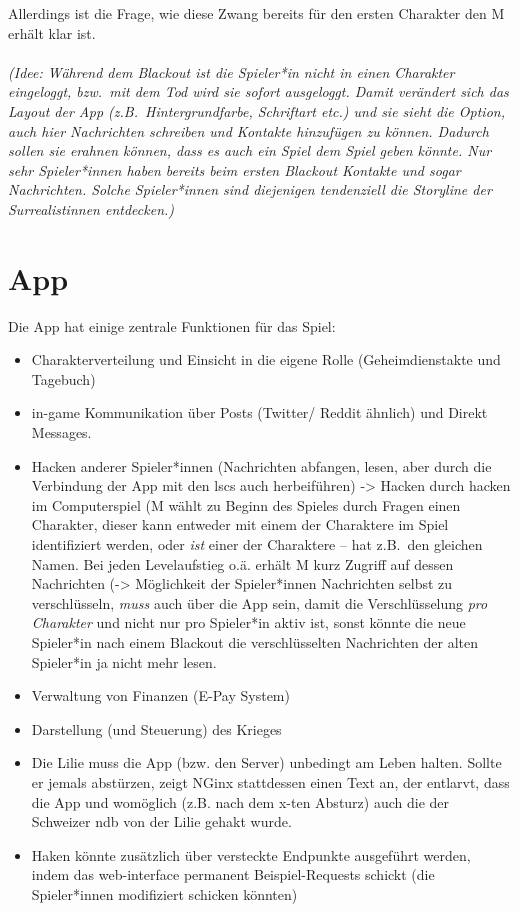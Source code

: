 Allerdings ist die Frage, wie diese Zwang bereits für den ersten Charakter den M
erhält klar ist.\\\\
%
\emph{(Idee: Während dem Blackout ist die Spieler*in nicht in einen Charakter
eingeloggt, bzw.~mit dem Tod wird sie sofort ausgeloggt. Damit verändert sich
das Layout der App (z.B.~Hintergrundfarbe, Schriftart etc.) und sie sieht 
die Option, auch hier Nachrichten schreiben und Kontakte hinzufügen zu können. 
Dadurch sollen sie erahnen können, dass es auch ein Spiel  dem Spiel
geben könnte. Nur sehr Spieler*innen haben bereits beim ersten Blackout Kontakte
und sogar Nachrichten. Solche Spieler*innen sind diejenigen tendenziell die
Storyline der Surrealistinnen entdecken.)}

\section{App} 
Die App hat einige zentrale Funktionen für das Spiel:
\begin{itemize}
  \item Charakterverteilung und Einsicht in die eigene Rolle (Geheimdienstakte
    und Tagebuch)
  \item in-game Kommunikation über Posts (Twitter/ Reddit ähnlich) und Direkt
    Messages. 
  \item Hacken anderer Spieler*innen (Nachrichten abfangen, lesen, aber durch
    die Verbindung der App mit den \ac{lsc}s auch 
    herbeiführen) -> Hacken durch hacken im Computerspiel (M wählt zu Beginn des
    Spieles durch Fragen einen Charakter, dieser kann entweder mit einem der
    Charaktere im Spiel identifiziert werden, oder \emph{ist} einer der
    Charaktere -- hat z.B.~den gleichen Namen. Bei jeden Levelaufstieg o.ä.
    erhält M kurz Zugriff auf dessen Nachrichten (-> Möglichkeit der
    Spieler*innen Nachrichten selbst zu verschlüsseln, \emph{muss} auch über die
    App sein, damit die Verschlüsselung \emph{pro Charakter} und nicht nur pro
    Spieler*in aktiv ist, sonst könnte die neue Spieler*in nach einem Blackout
    die verschlüsselten Nachrichten der alten Spieler*in ja nicht mehr lesen.
  \item Verwaltung von Finanzen (E-Pay System)
  \item Darstellung (und Steuerung) des Krieges
  \item Die Lilie muss die App (bzw. den Server) unbedingt am Leben halten.
    Sollte er jemals abstürzen, zeigt NGinx stattdessen einen Text an, der
    entlarvt, dass die App und womöglich (z.B. nach dem x-ten Absturz) auch die
    der Schweizer \ac{ndb} von der Lilie gehakt wurde.
  \item Haken könnte zusätzlich über versteckte Endpunkte ausgeführt werden,
    indem das web-interface permanent Beispiel-Requests schickt (die
    Spieler*innen modifiziert schicken könnten)
\end{itemize}

